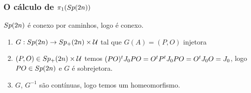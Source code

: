 \documentclass{beamer}
\begin{document}
	\begin{frame}
		\frametitle{O cálculo de $\pi_{1}(Sp(2n))$}
		\begin{teorema}\label{teoerma_sp2n_conexo}
			$Sp(2n)$ é conexo por caminhos, logo é conexo.
		\end{teorema}
		
		\begin{prova}
			\begin{enumerate}
				\item $G: Sp(2n) \to Sp_{+}(2n) \times \mathcal{U}$ tal que $G(A) = (P,O)$ injetora
				
				\pause
				\item $(P,O) \in Sp_{+}(2n) \times \mathcal{U}$ temos $(PO)^{t}J_{0} PO = O^{t}P^{t}J_{0} PO = O^{t}J_{0} O = J_{0}$, logo $PO \in Sp(2n)$ e $G$ é sobrejetora.
				
				\pause
				\item $G$, $G^{-1}$ são contínuas, logo temos um homeomorfismo.
				
			\end{enumerate}
		\end{prova}
	\end{frame}
	
\end{document}
